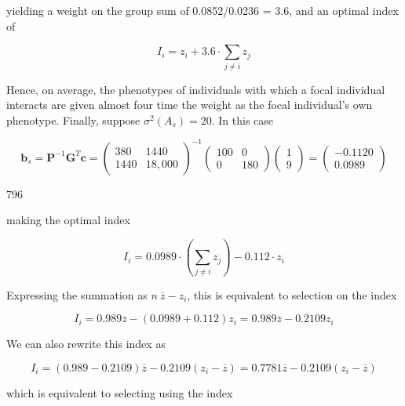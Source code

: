 \documentclass{article}
\begin{document}
yielding a weight on the group sum of 0.0852/0.0236 = 3.6, and an optimal index of

\begin{equation}
I_{i}=z_{i}+3.6\cdot\sum_{j\neq i}z_{j}
\end{equation}

Hence, on average, the phenotypes of individuals with which a focal individual interacts are given almost four time the weight as the focal individual's own phenotype. Finally, suppose  $ \sigma^{2}(A_{s}) = 20 $. In this case

\begin{equation}
\mathbf{b}_{s}=\mathbf{P}^{-1}\mathbf{G}^{T}\mathbf{c}=\begin{pmatrix}{{{380}}}&{{{1440}}} \\{{{1440}}}&{{{18,000}}}\end{pmatrix}^{-1}\begin{pmatrix}{{{100}}}&{{{0}}} \\{{{0}}}&{{{180}}}\end{pmatrix}\begin{pmatrix}{{{1}}} \\{{{9}}}\end{pmatrix}=\begin{pmatrix}{{{-0.1120}}} \\{{{0.0989}}}\end{pmatrix}
\end{equation}

796

making the optimal index

\begin{equation}
I_{i}=0.0989\cdot\left(\sum_{j\neq i}z_{j}\right)-0.112\cdot z_{i}
\end{equation}

Expressing the summation as  $ n\ \overline{z}-z_{i} $, this is equivalent to selection on the index

\begin{equation}
I_{i}=0.989\overline{z}-(0.0989+0.112)z_{i}=0.989\overline{z}-0.2109z_{i}
\end{equation}

We can also rewrite this index as

\begin{equation}
I_{i}=\left(0.989-0.2109\right)\overline{z}-0.2109\left(z_{i}-\overline{z}\right)=0.7781\overline{z}-0.2109\left(z_{i}-\overline{z}\right)
\end{equation}

which is equivalent to selecting using the index
\end{document}

